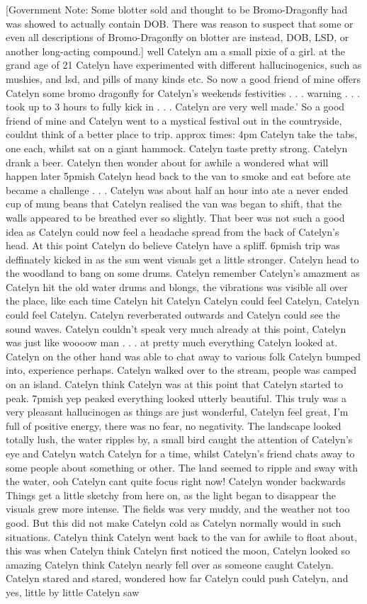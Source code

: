 \documentclass[12pt]{book}
\begin{document}
[Government Note: Some blotter sold and thought to be Bromo-Dragonfly had was showed to actually contain DOB. There was reason to suspect that some or even all descriptions of Bromo-Dragonfly on blotter are instead, DOB, LSD, or another long-acting compound.] well Catelyn am a small pixie of a girl. at the grand age of 21 Catelyn have experimented with different hallucinogenics, such as mushies, and lsd, and pills of many kinds etc. So now a good friend of mine offers Catelyn some bromo dragonfly for Catelyn's weekends festivities . . . warning . . .  took up to 3 hours to fully kick in . . .  Catelyn are very well made.' So a good friend of mine and Catelyn went to a mystical festival out in the countryside, couldnt think of a better place to trip. approx times: 4pm Catelyn take the tabs, one each, whilst sat on a giant hammock. Catelyn taste pretty strong. Catelyn drank a beer. Catelyn then wonder about for awhile a wondered what will happen later 5pmish Catelyn head back to the van to smoke and eat before ate became a challenge . . .  Catelyn was about half an hour into ate a never ended cup of mung beans that Catelyn realised the van was began to shift, that the walls appeared to be breathed ever so slightly. That beer was not such a good idea as Catelyn could now feel a headache spread from the back of Catelyn's head. At this point Catelyn do believe Catelyn have a spliff. 6pmish trip was deffinately kicked in as the sun went visuals get a little stronger. Catelyn head to the woodland to bang on some drums. Catelyn remember Catelyn's amazment as Catelyn hit the old water drums and blongs, the vibrations was visible all over the place, like each time Catelyn hit Catelyn Catelyn could feel Catelyn, Catelyn could feel Catelyn. Catelyn reverberated outwards and Catelyn could see the sound waves. Catelyn couldn't speak very much already at this point, Catelyn was just like woooow man . . .  at pretty much everything Catelyn looked at. Catelyn on the other hand was able to chat away to various folk Catelyn bumped into, experience perhaps. Catelyn walked over to the stream, people was camped on an island. Catelyn think Catelyn was at this point that Catelyn started to peak. 7pmish yep peaked everything looked utterly beautiful. This truly was a very pleasant hallucinogen as things are just wonderful, Catelyn feel great, I'm full of positive energy, there was no fear, no negativity. The landscape looked totally lush, the water ripples by, a small bird caught the attention of Catelyn's eye and Catelyn watch Catelyn for a time, whilst Catelyn's friend chats away to some people about something or other. The land seemed to ripple and sway with the water, ooh Catelyn cant quite focus right now! Catelyn wonder backwards Things get a little sketchy from here on, as the light began to disappear the visuals grew more intense. The fields was very muddy, and the weather not too good. But this did not make Catelyn cold as Catelyn normally would in such situations. Catelyn think Catelyn went back to the van for awhile to float about, this was when Catelyn think Catelyn first noticed the moon, Catelyn looked so amazing Catelyn think Catelyn nearly fell over as someone caught Catelyn. Catelyn stared and stared, wondered how far Catelyn could push Catelyn, and yes, little by little Catelyn saw 
\end{document}

